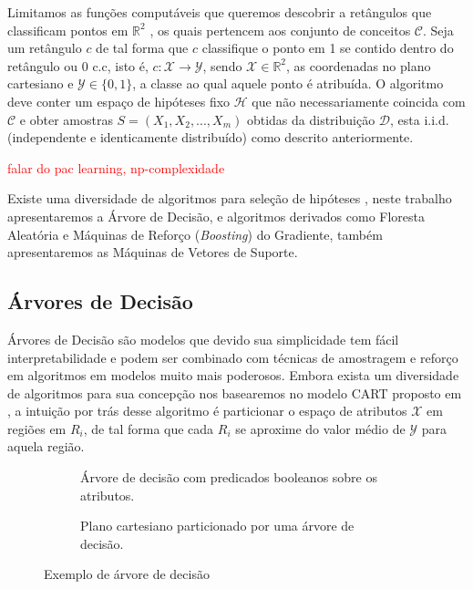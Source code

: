 Limitamos as funções computáveis que queremos descobrir a retângulos que
classificam pontos em $\mathbb{R}^2$ , os quais pertencem aos conjunto de
conceitos $\mathcal{C}$. Seja um retângulo $c$ de tal forma que $c$ classifique
o ponto em 1 se contido dentro do retângulo ou 0 c.c, isto é,
$c:\mathcal{X}\rightarrow\mathcal{Y}$, sendo $\mathcal{X} \in \mathbb{R}^2$, as
coordenadas no plano cartesiano e $\mathcal{Y} \in \{0,1\}$, a classe ao qual
aquele ponto é atribuída. O algoritmo deve conter um espaço de hipóteses fixo
$\mathcal{H}$ que não necessariamente coincida com $\mathcal{C}$ e obter
amostras $S=(X_1,X_2,...,X_m)$ obtidas da distribuição $\mathcal{D}$, esta
i.i.d. (independente e identicamente distribuído) como descrito anteriormente.

\textcolor{red}{falar do pac learning, np-complexidade}

Existe uma diversidade de algoritmos para seleção de hipóteses
\cite{bishop2006pattern,friedman2001elements}, neste trabalho apresentaremos a
Árvore de Decisão, e algoritmos derivados como Floresta Aleatória e Máquinas de
Reforço (\textit{Boosting}) do Gradiente, também apresentaremos as Máquinas de
Vetores de Suporte.

\subsection{Árvores de Decisão}
Árvores de Decisão são modelos que devido sua simplicidade tem fácil
interpretabilidade e podem ser combinado com técnicas de amostragem e reforço
em algoritmos em modelos muito mais poderosos. Embora exista um diversidade de
algoritmos para sua concepção nos basearemos no modelo CART proposto em
\cite{breiman1984classification}, a intuição por trás desse algoritmo é
particionar o espaço de atributos $\mathcal{X}$ em regiões em $R_i$, de
tal forma que cada $R_i$ se aproxime do valor médio de $\mathcal{Y}$ para
aquela região.

\begin{figure}[ht]
   \centering
    \begin{subfigure}{.4\textwidth}
        \centering
        \def\svgwidth{1.4\linewidth}
        \caption{Árvore de decisão com predicados booleanos sobre os atributos.}
        \label{fig:tree}
    \end{subfigure}
     \hfill
    \begin{subfigure}{.4\textwidth}
        \centering
        \def\svgwidth{.8\linewidth}
        \caption{Plano cartesiano particionado por uma árvore de decisão.}
        \label{fig:split}
    \end{subfigure}
    \caption{Exemplo de árvore de decisão}
    \label{fig:three graphs}
\end{figure}


